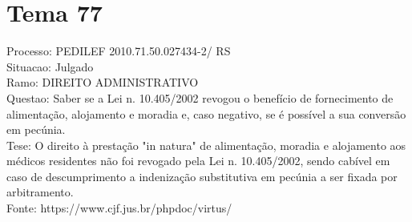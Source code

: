 \documentclass[12pt]{article}
\begin{document}
\section*{Tema 77}
Processo: PEDILEF 2010.71.50.027434-2/ RS\\
Situacao: Julgado\\
Ramo: DIREITO ADMINISTRATIVO\\
Questao: Saber se a Lei n. 10.405/2002 revogou o benefício de fornecimento de alimentação, alojamento e moradia e, caso negativo, se é possível a sua conversão em pecúnia.\\
Tese: O direito à prestação "in natura" de alimentação, moradia e alojamento aos médicos residentes não foi revogado pela Lei n. 10.405/2002, sendo cabível em caso de descumprimento a indenização substitutiva em pecúnia a ser fixada por arbitramento.\\
Fonte: https://www.cjf.jus.br/phpdoc/virtus/
\end{document}
